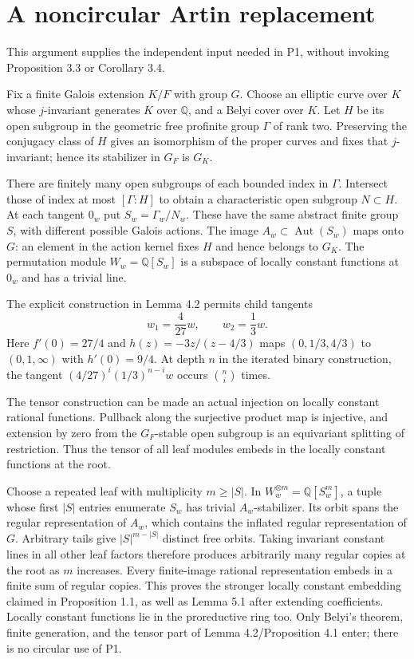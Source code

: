 \documentclass[10pt]{article}
\begin{document}
\section*{A noncircular Artin replacement}
This argument supplies the independent input needed in P1, without invoking Proposition 3.3 or Corollary 3.4.\par
Fix a finite Galois extension \(K/F\) with group \(G\). Choose an elliptic curve over \(K\) whose \(j\)-invariant generates \(K\) over \(\mathbb Q\), and a Belyi cover over \(K\). Let \(H\) be its open subgroup in the geometric free profinite group \(\Gamma\) of rank two. Preserving the conjugacy class of \(H\) gives an isomorphism of the proper curves and fixes that \(j\)-invariant; hence its stabilizer in \(G_F\) is \(G_K\).\par
There are finitely many open subgroups of each bounded index in \(\Gamma\). Intersect those of index at most \([\Gamma:H]\) to obtain a characteristic open subgroup \(N\subset H\). At each tangent \(0_w\) put \(S_w=\Gamma_w/N_w\). These have the same abstract finite group \(S\), with different possible Galois actions. The image \(A_w\subset\operatorname{Aut}(S_w)\) maps onto \(G\): an element in the action kernel fixes \(H\) and hence belongs to \(G_K\). The permutation module \(W_w=\mathbb Q[S_w]\) is a subspace of locally constant functions at \(0_w\) and has a trivial line.\par
The explicit construction in Lemma 4.2 permits child tangents \[w_1=\frac4{27}w,\qquad w_2=\frac13w .\] Here \(f'(0)=27/4\) and \(h(z)=-3z/(z-4/3)\) maps \((0,1/3,4/3)\) to \((0,1,\infty)\) with \(h'(0)=9/4\). At depth \(n\) in the iterated binary construction, the tangent \((4/27)^i(1/3)^{n-i}w\) occurs \(\binom ni\) times.\par
The tensor construction can be made an actual injection on locally constant rational functions. Pullback along the surjective product map is injective, and extension by zero from the \(G_F\)-stable open subgroup is an equivariant splitting of restriction. Thus the tensor of all leaf modules embeds in the locally constant functions at the root.\par
Choose a repeated leaf with multiplicity \(m\ge |S|\). In \(W_w^{\otimes m}=\mathbb Q[S_w^m]\), a tuple whose first \(|S|\) entries enumerate \(S_w\) has trivial \(A_w\)-stabilizer. Its orbit spans the regular representation of \(A_w\), which contains the inflated regular representation of \(G\). Arbitrary tails give \(|S|^{m-|S|}\) distinct free orbits. Taking invariant constant lines in all other leaf factors therefore produces arbitrarily many regular copies at the root as \(m\) increases. Every finite-image rational representation embeds in a finite sum of regular copies. This proves the stronger locally constant embedding claimed in Proposition 1.1, as well as Lemma 5.1 after extending coefficients. Locally constant functions lie in the proreductive ring too. Only Belyi’s theorem, finite generation, and the tensor part of Lemma 4.2/Proposition 4.1 enter; there is no circular use of P1.\par
\end{document}
